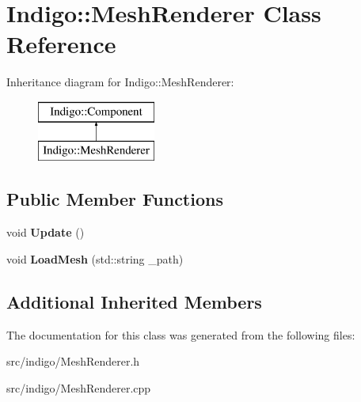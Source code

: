 \hypertarget{class_indigo_1_1_mesh_renderer}{}\section{Indigo\+:\+:Mesh\+Renderer Class Reference}
\label{class_indigo_1_1_mesh_renderer}
Inheritance diagram for Indigo\+:\+:Mesh\+Renderer\+:\begin{figure}[H]
\begin{center}
\leavevmode
\includegraphics[height=2.000000cm]{class_indigo_1_1_mesh_renderer}
\end{center}
\end{figure}
\subsection*{Public Member Functions}
\begin{DoxyCompactItemize}
\item 
\mbox{\label{class_indigo_1_1_mesh_renderer_ae2812e86bacf82ab59875aa2acd8fce9}} 
void {\bfseries Update} ()
\item 
\mbox{\label{class_indigo_1_1_mesh_renderer_a42321ee7644cfaeee02b5ba2175b2740}} 
void {\bfseries Load\+Mesh} (std\+::string \+\_\+path)
\end{DoxyCompactItemize}
\subsection*{Additional Inherited Members}


The documentation for this class was generated from the following files\+:\begin{DoxyCompactItemize}
\item 
src/indigo/Mesh\+Renderer.\+h\item 
src/indigo/Mesh\+Renderer.\+cpp\end{DoxyCompactItemize}
